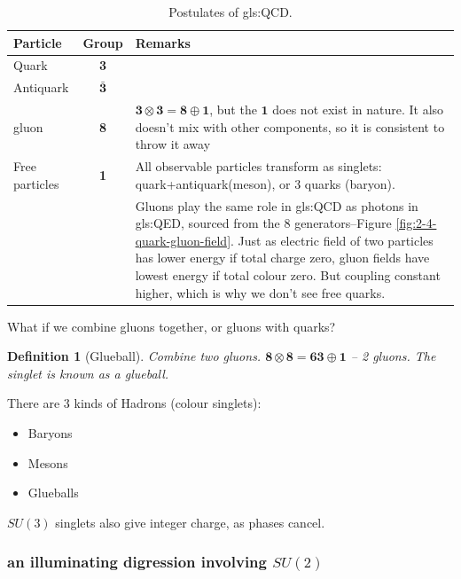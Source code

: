 \documentclass[]{article}
\newtheorem{defn}[thm]{Definition}
\begin{document}
\begin{table}[H]
	\begin{center}
		\caption{Postulates of \gls{gls:QCD}.}\label{table:postulates:QCD}
		\begin{tabular}{|l|c|p{8cm}|} \hline
			\textbf{Particle}&\textbf{Group}&\textbf{Remarks} \\ \hline
			Quark&{\bfseries 3}& \\ \hline
			Antiquark&$\bm{\bar{3}}$& \\ \hline
			gluon&{\bfseries 8}&$\bm{3}\otimes\bm{3}=\bm{8}\oplus\bm{1}$, but the $\bm{1}$ does not exist in nature. It also doesn't mix with other components, so it is consistent to throw it away \\ \hline
			Free particles&{\bfseries 1}&All observable particles transform as singlets: quark+antiquark(meson), or 3 quarks (baryon).\\ \hline
			&&Gluons play the same role in \gls{gls:QCD} as photons in \gls{gls:QED}, sourced from the 8 generators--Figure \ref{fig:2-4-quark-gluon-field}. Just as electric field of two particles has lower energy if total charge zero, gluon fields have lowest energy if total colour zero. But coupling constant higher, which is why we don't see free quarks.\\ \hline
		\end{tabular}
	\end{center}
\end{table}

What if we combine gluons together, or gluons with quarks?

\begin{defn}[Glueball]\label{defn:glueball}
	Combine two gluons. $\bm{8} \otimes \bm{8} = \bm{63} \oplus \bm{1}$ -- 2 gluons. The singlet is known as a glueball.
\end{defn}

There are 3 kinds of Hadrons (colour singlets):
\begin{itemize}
	\item Baryons
	\item Mesons
	\item Glueballs
\end{itemize}

$SU(3)$ singlets also give integer charge, as phases cancel.

\subsubsection{an illuminating digression involving $SU(2)$} 
\end{document}
